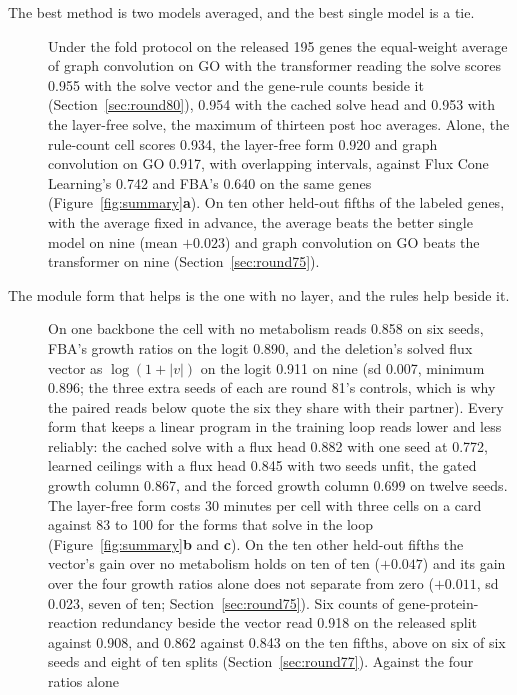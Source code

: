 \begin{description}
  \item[The best method is two models averaged, and the best single model is a tie.]
    Under the fold protocol on the released 195 genes the equal-weight average of graph
    convolution on GO with the transformer reading the solve scores 0.955 with the solve
    vector and the gene-rule counts beside it (Section~\ref{sec:round80}), 0.954 with
    the cached solve head and 0.953 with the layer-free solve, the maximum of thirteen
    post hoc averages. Alone, the rule-count cell scores 0.934, the layer-free form
    0.920 and graph convolution on GO 0.917, with overlapping intervals, against Flux
    Cone Learning's 0.742 and FBA's 0.640 on the same genes
    (Figure~\ref{fig:summary}\textbf{a}). On ten other held-out fifths of the labeled
    genes, with the average fixed in advance, the average beats the better single model
    on nine (mean $+0.023$) and graph convolution on GO beats the transformer on nine
    (Section~\ref{sec:round75}).
  \item[The module form that helps is the one with no layer, and the rules help beside
    it.] On one backbone the cell
    with no metabolism reads 0.858 on six seeds, FBA's growth ratios on the logit 0.890,
    and the deletion's solved flux vector as $\log(1 + |v|)$ on the logit 0.911 on nine
    (sd 0.007, minimum 0.896; the three extra seeds of each are round 81's controls,
    which is why the paired reads below quote the six they share with their partner). Every form that keeps a linear program in the training
    loop reads lower and less reliably: the cached solve with a flux head 0.882 with one
    seed at 0.772, learned ceilings with a flux head 0.845 with two seeds unfit, the
    gated growth column 0.867, and the forced growth column 0.699 on twelve seeds. The
    layer-free form costs 30 minutes per cell with three cells on a card against 83 to
    100 for the forms that solve in the loop
    (Figure~\ref{fig:summary}\textbf{b} and \textbf{c}). On the ten other held-out
    fifths the vector's gain over no metabolism holds on ten of ten ($+0.047$) and its
    gain over the four growth ratios alone does not separate from zero ($+0.011$, sd
    0.023, seven of ten; Section~\ref{sec:round75}). Six counts of
    gene-protein-reaction redundancy beside the vector read 0.918 on the released split
    against 0.908, and 0.862 against 0.843 on the ten fifths, above on six of six seeds
    and eight of ten splits (Section~\ref{sec:round77}). Against the four ratios alone

\end{description}
